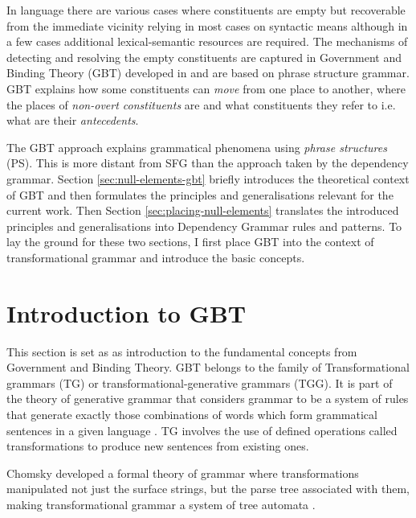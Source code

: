     In language there are various cases where constituents are empty but recoverable from the immediate vicinity relying in most cases on syntactic means although in a few cases additional lexical-semantic resources are required. The mechanisms of detecting and resolving the empty constituents are captured in Government and Binding Theory (GBT) developed in \citet{Chomsky81, Chomsky1982, Chomsky1986} and are based on phrase structure grammar. GBT explains how some constituents can \textit{move} from one place to another, where the places of \textit{non-overt constituents} are and what constituents they refer to i.e. what are their \textit{antecedents}. 

    The GBT approach explains grammatical phenomena using \textit{phrase structures} (PS). This is more distant from SFG than the approach taken by the dependency grammar. Section \ref{sec:null-elements-gbt} briefly introduces the theoretical context of GBT and then formulates the principles and generalisations relevant for the current work. Then Section \ref{sec:placing-null-elements} translates the introduced principles and generalisations into Dependency Grammar rules and patterns. To lay the ground for these two sections, I first place GBT into the context of transformational grammar and introduce the basic concepts.

\section{Introduction to GBT}
\label{sec:phrase-structure}

    This section is set as as introduction to the fundamental concepts from Government and Binding Theory. GBT belongs to the family of Transformational grammars (TG) or transformational-generative grammars (TGG). It is part of the theory of generative grammar that considers grammar to be a system of rules that generate exactly those combinations of words which form grammatical sentences in a given language \mbox{\citep{Chomsky65}}. TG involves the use of defined operations called transformations to produce new sentences from existing ones.

    Chomsky developed a formal theory of grammar \citep{Chomsky56} where transformations manipulated not just the surface strings, but the parse tree associated with them, making transformational grammar a system of tree automata \mbox{\citep{Stockwell1973}}.

